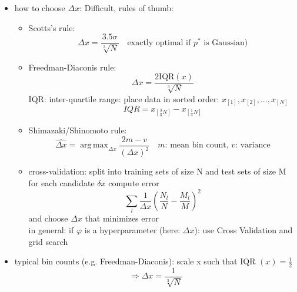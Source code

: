 \documentclass[11pt]{article}
\DeclareMathOperator*{\argmax}{arg\,max}
\begin{document}
           \begin{itemize}
             \item how to choose $\Delta x$: Difficult, rules of thumb:
             \begin{itemize}
               \item Scotts's rule:
               \begin{equation*}
                 \Delta x = \frac{3.5 \sigma}{\sqrt[3]{N}} \quad \text{exactly optimal if $p^*$ is Gaussian)}
               \end{equation*}
               \item Freedman-Diaconis rule:
               \begin{equation*}
                 \Delta x = \frac{2\text{IQR}(x)}{\sqrt[3]{N}}
               \end{equation*}
               IQR: inter-quartile range:
               place data in sorted order: $x_{[1]},x_{[2]},...,x_{[N]}$
               \begin{equation*}
                 IQR = x_{[\frac{3}{4}N]}-x_{[\frac{1}{4}N]}
               \end{equation*}
               \item Shimazaki/Shinomoto rule:
               \begin{equation*}
                 \hat{\Delta x}= \argmax_{\Delta x} \frac{2m-v}{(\Delta x)^2} \quad \text{$m$: mean bin count, $v$: variance}
               \end{equation*}
               \item cross-validation: split into training sets of size N and test sets of size M \\
               for each candidate $\delta x$ compute error
               \begin{equation*}
                 \sum_l \frac{1}{\Delta x}(\frac{N_l}{N}-\frac{M_l}{M})^2
               \end{equation*}
               and choose $\Delta x$ that minimizes error \\
               in general: if $\varphi$ is a hyperparameter (here: $\Delta x$): use Cross Validation
               and grid search
              \end{itemize}
             \item typical bin counts (e.g. Freedman-Diaconis): scale x such that IQR $(x)=\frac{1}{2}$
             \begin{equation*}
               \Rightarrow \Delta x = \frac{1}{\sqrt[3]{N}}
             \end{equation*}

\end{itemize}
\end{document}
